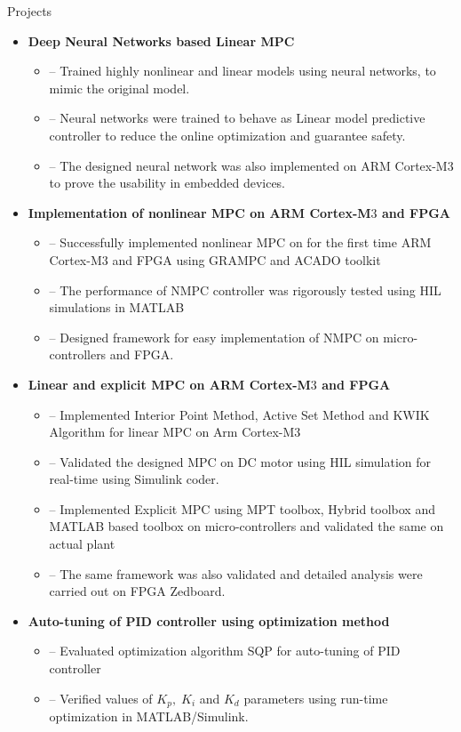 \documentclass[11pt]{resume}
\newcommand{\mt}{\textsc{MATLAB}}
\newenvironment{outerlist}[1][\enskip\textbullet]%
{\begin{itemize}[#1,leftmargin=*]}{\end{itemize}%
	\vspace{-.5\baselineskip}}
\newenvironment{innerlist}[1][\enskip\textbullet]%
{\begin{itemize}[#1,leftmargin=*,parsep=0pt,itemsep=0pt,topsep=0pt,partopsep=0pt]}
	{\end{itemize}}
\begin{document}
\begin{rSection}{Projects}
	\begin{outerlist}
		\item \textbf{Deep Neural Networks based Linear MPC} 
		\begin{innerlist}
			\item[--] Trained highly nonlinear and linear models using neural networks, to mimic the original model.
			\item[--] Neural networks were trained to behave as Linear model predictive controller to reduce the online optimization and guarantee safety. 
			\item[--] The designed neural network was also implemented on ARM Cortex-M$ 3 $ to prove the usability in embedded devices.
		\end{innerlist}
	
		\item \textbf{Implementation of nonlinear MPC on ARM Cortex-M$ 3 $ and FPGA} 
		\begin{innerlist}
			\item[--] Successfully implemented nonlinear MPC on for the first time ARM Cortex-M$ 3 $ and FPGA using GRAMPC and ACADO toolkit
			\item[--] The performance of NMPC controller was rigorously tested using HIL simulations in \mt 
			\item[--] Designed framework for easy implementation of NMPC on micro-controllers and FPGA.
		\end{innerlist}
	
		\item \textbf{Linear and explicit MPC on ARM Cortex-M$ 3 $ and FPGA} 
		\begin{innerlist}
			\item[--] Implemented Interior Point Method, Active Set Method and KWIK Algorithm for linear MPC on Arm Cortex-M$3$
			\item[--] Validated the designed MPC on DC motor using HIL simulation for real-time using Simulink coder.
			\item[--] Implemented Explicit MPC using MPT toolbox, Hybrid toolbox and MATLAB based toolbox on micro-controllers and validated the same on actual plant
			\item[--] The same framework was also validated and detailed analysis were carried out on FPGA Zedboard.
		\end{innerlist}
	
		\item \textbf{Auto-tuning of PID controller using optimization method} 
		\begin{innerlist}
			\item[--] Evaluated optimization algorithm SQP for auto-tuning of PID controller 
			\item[--] Verified values of $ K_{p}, \; K_{i} $ and $ K_d $ parameters using run-time optimization in \mt/Simulink.
		\end{innerlist}	
	

\end{outerlist}
\end{rSection}
\end{document}
